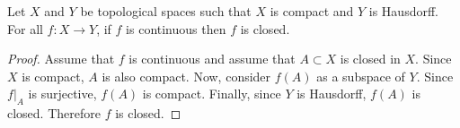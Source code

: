 \documentclass[letterpaper,12pt,fleqn]{article}
\begin{document}
\begin{theorem}
  Let \(X\) and \(Y\) be topological spaces such that \(X\) is compact and \(Y\) is Hausdorff.  For all \(f:X\to Y\),
  if \(f\) is continuous then \(f\) is closed.
\end{theorem}

\begin{proof}
  Assume that \(f\) is continuous and assume that \(A\subset X\) is closed in \(X\).  Since \(X\) is compact,
  \(A\) is also compact.  Now, consider \(f(A)\) as a subspace of \(Y\).  Since \(f|_A\) is surjective, \(f(A)\)
  is compact.  Finally, since \(Y\) is Hausdorff, \(f(A)\) is closed.  Therefore \(f\) is closed.
\end{proof}
\end{document}
